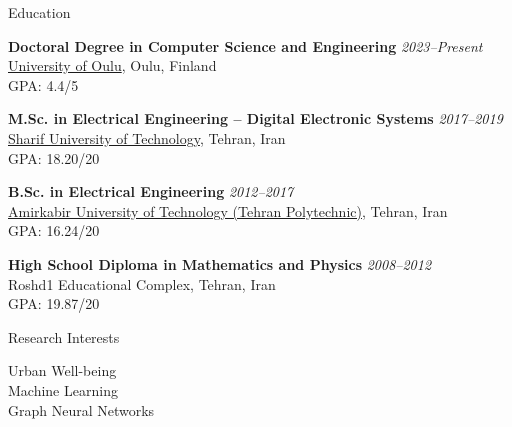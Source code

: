 \documentclass{resume}
\begin{document}

\begin{rSection}{Education}
\vspace{+.1cm}

{\bf Doctoral Degree in Computer Science and Engineering} \hfill {\em 2023--Present} \\
\href{https://www.oulu.fi/}{University of Oulu}, Oulu, Finland \\
GPA: 4.4/5

{\bf M.Sc. in Electrical Engineering -- Digital Electronic Systems} \hfill {\em 2017--2019} \\
\href{http://www.en.sharif.edu/}{Sharif University of Technology}, Tehran, Iran \\
GPA: 18.20/20

{\bf B.Sc. in Electrical Engineering} \hfill {\em 2012--2017} \\
\href{https://www.aut.ac.ir/en}{Amirkabir University of Technology (Tehran Polytechnic)}, Tehran, Iran \\
GPA: 16.24/20

{\bf High School Diploma in Mathematics and Physics} \hfill {\em 2008--2012} \\
Roshd1 Educational Complex, Tehran, Iran \\
GPA: 19.87/20

\end{rSection}


\begin{rSection}{Research Interests}
\vspace{+.1cm}

Urban Well-being \\
Machine Learning \\
Graph Neural Networks

\end{rSection}

\end{document}
